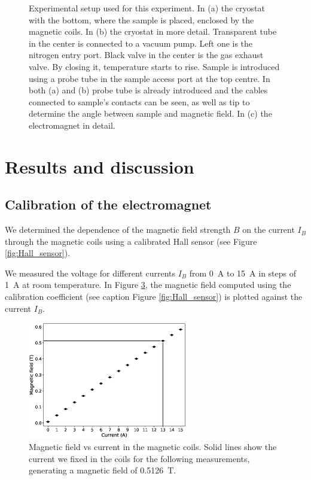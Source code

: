 \documentclass[11pt,a4paper]{article}
\begin{document}
\begin{figure}[H]
\begin{subfigure}[b]{0.5\textwidth}
\caption{}
\label{fig:electromagnet}
\end{subfigure}
\caption{Experimental setup used for this experiment. In (a) the cryostat with the bottom, where the sample is placed, enclosed by the magnetic coils. In (b) the cryostat in more detail. Transparent tube in the center is connected to a vacuum pump. Left one is the nitrogen entry port. Black valve in the center is the gas exhaust valve. By closing it, temperature starts to rise. Sample is introduced using a probe tube in the sample access port at the top centre. In both (a) and (b) probe tube is already introduced and the cables connected to sample's contacts can be seen, as well as tip to determine the angle between sample and magnetic field. In (c) the electromagnet in detail.}
\label{fig:experimental_setup_all}
\end{figure}

\newpage
\section{Results and discussion}

\subsection{Calibration of the electromagnet}

We determined the dependence of the magnetic field strength $B$ on the current $I_B$ through the magnetic coils using a calibrated Hall sensor (see Figure \ref{fig:Hall_sensor}).

We measured the voltage for different currents $I_B$ from \SI{0}{\ampere} to \SI{15}{\ampere} in steps of \SI{1}{\ampere} at room temperature. In Figure \ref{fig:magnetic_field}, the magnetic field computed using the calibration coefficient (see caption Figure \ref{fig:Hall_sensor}) is plotted against the current $I_B$.

\begin{figure}[H]
\centering
\includegraphics[width=0.62\textwidth]{Magnetic_field_vs_current.eps}
\caption{Magnetic field vs current in the magnetic coils. Solid lines show the current we fixed in the coils for the following measurements, generating a magnetic field of \SI{0.5126}{\tesla}.}
\label{fig:magnetic_field}
\end{figure}
\end{document}

